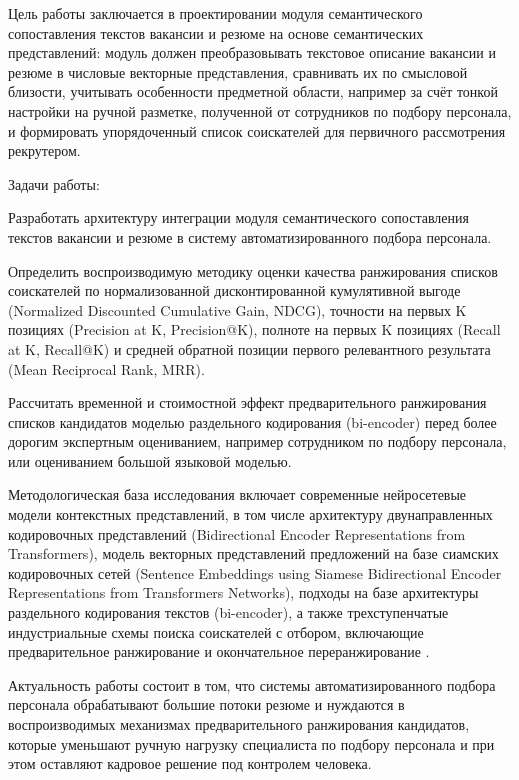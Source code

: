 Цель работы заключается в проектировании модуля семантического сопоставления текстов вакансии и резюме на основе семантических представлений: модуль должен преобразовывать текстовое описание вакансии и резюме в числовые векторные представления, сравнивать их по смысловой близости, учитывать особенности предметной области, например за счёт тонкой настройки на ручной разметке, полученной от сотрудников по подбору персонала, и формировать упорядоченный список соискателей для первичного рассмотрения рекрутером.\par
Задачи работы:\par
\begin{compactenum}
  \item Разработать архитектуру интеграции модуля семантического сопоставления текстов вакансии и резюме в систему автоматизированного подбора персонала.
  \item Определить воспроизводимую методику оценки качества ранжирования списков соискателей по нормализованной дисконтированной кумулятивной выгоде (Normalized Discounted Cumulative Gain, NDCG), точности на первых K позициях (Precision at K, Precision@K), полноте на первых K позициях (Recall at K, Recall@K) и средней обратной позиции первого релевантного результата (Mean Reciprocal Rank, MRR).
  \item Рассчитать временной и стоимостной эффект предварительного ранжирования списков кандидатов моделью раздельного кодирования (bi-encoder) перед более дорогим экспертным оцениванием, например сотрудником по подбору персонала, или оцениванием большой языковой моделью.
\end{compactenum}
Методологическая база исследования включает современные нейросетевые модели контекстных представлений, в том числе архитектуру двунаправленных кодировочных представлений (Bidirectional Encoder Representations from Transformers), модель векторных представлений предложений на базе сиамских кодировочных сетей (Sentence Embeddings using Siamese Bidirectional Encoder Representations from Transformers Networks), подходы на базе архитектуры раздельного кодирования текстов (bi-encoder), а также трехступенчатые индустриальные схемы поиска соискателей с отбором, включающие предварительное ранжирование и окончательное переранжирование \cite{src01, src06, src08, src17}.\par
Актуальность работы состоит в том, что системы автоматизированного подбора персонала обрабатывают большие потоки резюме и нуждаются в воспроизводимых механизмах предварительного ранжирования кандидатов, которые уменьшают ручную нагрузку специалиста по подбору персонала и при этом оставляют кадровое решение под контролем человека.\par
